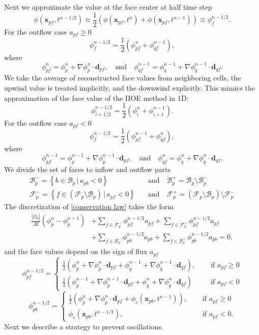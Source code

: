 \documentclass{article}
\begin{document}
Next we approximate the value at the face center at half time step
\[
	\phi(\boldsymbol{x}_{pf},t^{n-1/2})
	\approx
	\frac{1}{2}(\phi(\boldsymbol{x}_{pf},t^n) + \phi(\boldsymbol{x}_{pf},t^{n-1}))
	\equiv
	\phi_{f}^{n-1/2}.
\]
For the outflow case $ a_{pf} \geq 0 $
\[
	\phi_{f}^{n-1/2} = \frac{1}{2}(\phi_{pf}^n + \phi_{qf}^{n-1}),
\]
where 
\[
	\phi_{pf}^{n} = \phi_p^{n} + \nabla\phi_p^{n}\cdot\boldsymbol{d}_{pf},
	\quad \text{and} \quad
	\phi_{qf}^{n-1} = \phi_q^{n-1} + \nabla\phi_q^{n-1}\cdot\boldsymbol{d}_{qf}.
\]
We take the average of reconstructed face values from neighboring cells, 
the upwind value is treated implicitly, and the downwind explicitly. 
This mimics the approximation of the face value of the IIOE method in 1D:
\[
	\phi_{i+1/2}^{n-1/2} = \frac{1}{2}(\phi_i^{n} + \phi_{i+1}^{n-1}).
\]
For the outflow case $ a_{pf} < 0 $
\[
	\phi_{f}^{n-1/2} = \frac{1}{2}(\phi_{pf}^{n-1} + \phi_{qf}^{n}),
\]
where 
\[
	\phi_{pf}^{n-1} = \phi_p^{n-1} + \nabla\phi_p^{n-1}\cdot\boldsymbol{d}_{pf},
	\quad \text{and} \quad
	\phi_{qf}^{n} = \phi_q^{n} + \nabla\phi_q^{n}\cdot\boldsymbol{d}_{qf}.
\]
We divide the set of faces to inflow and outflow parts
\begin{align*}
	\mathcal{B}_p^- = \left\{b \in \mathcal{B}_p\, |\, a_{pb} < 0\right\}\
	\quad &\text{and} \quad
	\mathcal{B}_p^+ = \mathcal{B}_p \setminus \mathcal{B}_p^- \\
	\mathcal{F}_p^- = \left\{f \in (\mathcal{F}_p \setminus \mathcal{B}_p) \, |\, a_{pf} < 0\right\}
	\quad &\text{and} \quad 
	\mathcal{F}_p^+ = (\mathcal{F}_p \setminus \mathcal{B}_p) \setminus \mathcal{F}_p^- 
\end{align*}
The discretization of \eqref{conservation law} takes the form
\begin{align}
	\nonumber
	\frac{|\Omega_p|}{\Delta t}(\phi_p^{n} - \phi_p^{n-1})
	&+ \sum_{f \in \mathcal{F}_p^-} \phi_{pf}^{n-1/2} a_{pf}
	+ \sum_{f \in \mathcal{F}_p^+} \phi_{pf}^{n-1/2} a_{pf}\\ 
	&+ \sum_{f \in \mathcal{B}_p^-} \phi_{pb}^{n-1/2} a_{pb}
	+ \sum_{f \in \mathcal{B}_p^+} \phi_{pb}^{n-1/2} a_{pb} = 0,
\end{align}
and the face values depend on the sign of flux $ a_{pf} $
\[
	\phi_{pf}^{n-1/2} =
	\begin{cases}
		\frac{1}{2}(\phi_p^n + \nabla\phi_p^n\cdot\boldsymbol{d}_{pf} + 
		\phi_q^{n-1} + \nabla\phi_q^{n-1}\cdot\boldsymbol{d}_{qf}),
		\quad &\text{ if } a_{pf} \geq 0 \\
		\frac{1}{2}(\phi_p^{n-1} + \nabla\phi_p^{n-1}\cdot\boldsymbol{d}_{pf} + 
		\phi_q^{n} + \nabla\phi_q^{n}\cdot\boldsymbol{d}_{qf})
		\quad &\text{ if } a_{pf} < 0
	\end{cases}
\]
\[
	\phi_{pb}^{n-1/2} =
	\begin{cases}
		\frac{1}{2}\left(\phi_p^n + \nabla\phi_p^n\cdot\boldsymbol{d}_{pf} + 
		\phi_e(\boldsymbol{x}_{pb}, t^{n-1})\right),
		\quad &\text{ if } a_{pf} \geq 0 \\
		\phi_e(\boldsymbol{x}_{pb}, t^{n-1/2}),
		\quad &\text{ if } a_{pf} < 0.
	\end{cases}
\]
Next we describe a strategy to prevent oscillations.\\
\end{document}
